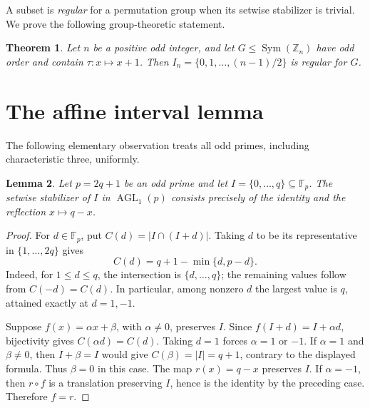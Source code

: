 \documentclass[11pt]{article}
\newtheorem{theorem}{Theorem}[section]
\newtheorem{lemma}[theorem]{Lemma}
\newcommand{\Z}{\mathbb Z}
\newcommand{\F}{\mathbb F}
\newcommand{\Sym}{\operatorname{Sym}}
\newcommand{\AGL}{\operatorname{AGL}}
\begin{document}
A subset is \emph{regular} for a permutation group when its setwise
stabilizer is trivial. We prove the following group-theoretic statement.

\begin{theorem}\label{thm:main}
Let $n$ be a positive odd integer, and let $G\leq\Sym(\Z_n)$ have odd
order and contain $\tau:x\mapsto x+1$. Then
$I_n=\{0,1,\ldots,(n-1)/2\}$ is regular for $G$.
\end{theorem}

\section{The affine interval lemma}
The following elementary observation treats all odd primes, including
characteristic three, uniformly.

\begin{lemma}\label{lem:affine}
Let $p=2q+1$ be an odd prime and let $I=\{0,\ldots,q\}\subseteq\F_p$.
The setwise stabilizer of $I$ in $\AGL_1(p)$ consists precisely of the
identity and the reflection $x\mapsto q-x$.
\end{lemma}
\begin{proof}
For $d\in\F_p$, put $C(d)=|I\cap(I+d)|$. Taking $d$ to be its
representative in $\{1,\ldots,2q\}$ gives
\[
 C(d)=q+1-\min\{d,p-d\}.
\]
Indeed, for $1\leq d\leq q$, the intersection is $\{d,\ldots,q\}$;
the remaining values follow from $C(-d)=C(d)$. In particular, among
nonzero $d$ the largest value is $q$, attained exactly at $d=1,-1$.

Suppose $f(x)=\alpha x+\beta$, with $\alpha\neq0$, preserves $I$.
Since $f(I+d)=I+\alpha d$, bijectivity gives $C(\alpha d)=C(d)$.
Taking $d=1$ forces $\alpha=1$ or $-1$. If $\alpha=1$ and
$\beta\neq0$, then $I+\beta=I$ would give $C(\beta)=|I|=q+1$,
contrary to the displayed formula. Thus $\beta=0$ in this case.
The map $r(x)=q-x$ preserves $I$. If $\alpha=-1$, then $r\circ f$
is a translation preserving $I$, hence is the identity by the preceding
case. Therefore $f=r$.
\end{proof}
\end{document}
